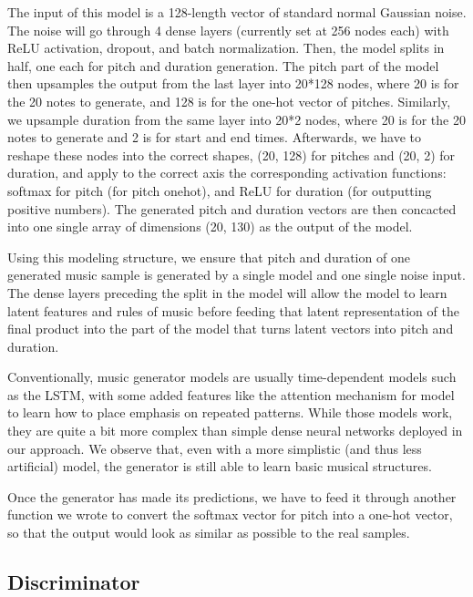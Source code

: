 \documentclass[12pt,oneside]{chicagocapstone}
\begin{document}
The input of this model is a 128-length vector of standard normal Gaussian noise. The noise will go through 4 dense layers (currently set at 256 nodes each) with ReLU activation, dropout, and batch normalization. Then, the model splits in half, one each for pitch and duration generation. The pitch part of the model then upsamples the output from the last layer into 20*128 nodes, where 20 is for the 20 notes to generate, and 128 is for the one-hot vector of pitches. Similarly, we upsample duration from the same layer into 20*2 nodes, where 20 is for the 20 notes to generate and 2 is for start and end times. Afterwards, we have to reshape these nodes into the correct shapes, (20, 128) for pitches and (20, 2) for duration, and apply to the correct axis the corresponding activation functions: softmax for pitch (for pitch onehot), and ReLU for duration (for outputting positive numbers). The generated pitch and duration vectors are then concacted into one single array of dimensions (20, 130) as the output of the model.

Using this modeling structure, we ensure that pitch and duration of one generated music sample is generated by a single model and one single noise input. The dense layers preceding the split in the model will allow the model to learn latent features and rules of music before feeding that latent representation of the final product into the part of the model that turns latent vectors into pitch and duration.

Conventionally, music generator models are usually time-dependent models such as the LSTM, with some added features like the attention mechanism for model to learn how to place emphasis on repeated patterns. While those models work, they are quite a bit more complex than simple dense neural networks deployed in our approach. We observe that, even with a more simplistic (and thus less artificial) model, the generator is still able to learn basic musical structures.

Once the generator has made its predictions, we have to feed it through another function we wrote to convert the softmax vector for pitch into a one-hot vector, so that the output would look as similar as possible to the real samples.

\hypertarget{discriminator}{%
\subsection*{Discriminator}\label{discriminator}}
\end{document}
